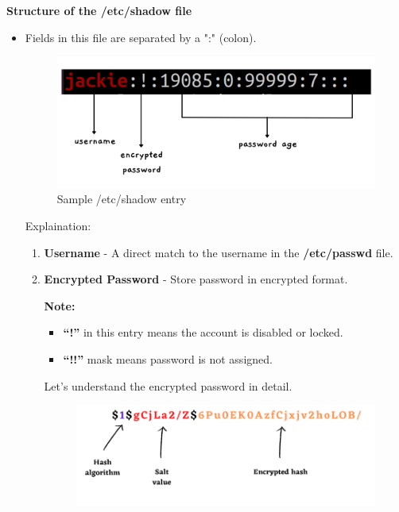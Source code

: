 \begin{flushleft}
\textbf{Structure of the /etc/shadow file}
\begin{itemize}
	\item Fields in this file are separated by a ":" (colon).
	\begin{figure}[h!]
		\centering
		\includegraphics[scale=.4]{content/chapter4/images/pass4.png}
		\caption{Sample /etc/shadow entry}
		\label{fig:user_group}
	\end{figure}	
	\newline
	Explaination:
	\begin{enumerate}
		\item \textbf{Username} - A direct match to the username in the \textbf{/etc/passwd} file.
		\item \textbf{Encrypted Password} - Store password in encrypted format.
		\bigskip
		\begin{tcolorbox}[breakable,notitle,boxrule=-0pt,colback=yellow,colframe=yellow]
			\color{black}
			\textbf{Note:} 
			\begin{itemize}
				\item \textbf{“!”} in this entry means the account is disabled or locked. 
				\item \textbf{“!!”} mask means password is not assigned.
			\end{itemize}
		\end{tcolorbox}	
		Let's understand the encrypted password in detail.
		\newpage	
		\begin{figure}[h!]
			\centering
			\includegraphics[scale=.5]{content/chapter4/images/pass.png}

\end{figure}
\end{enumerate}
\end{itemize}
\end{flushleft}
